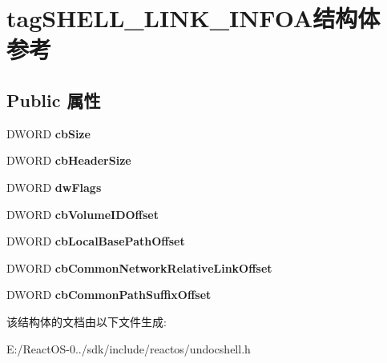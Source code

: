\hypertarget{structtag_s_h_e_l_l___l_i_n_k___i_n_f_o_a}{}\section{tag\+S\+H\+E\+L\+L\+\_\+\+L\+I\+N\+K\+\_\+\+I\+N\+F\+O\+A结构体 参考}
\label{structtag_s_h_e_l_l___l_i_n_k___i_n_f_o_a}
\subsection*{Public 属性}
\begin{DoxyCompactItemize}
\item 
\mbox{\label{structtag_s_h_e_l_l___l_i_n_k___i_n_f_o_a_a68884a5ecc94ac42af22512107b79ba3}} 
D\+W\+O\+RD {\bfseries cb\+Size}
\item 
\mbox{\label{structtag_s_h_e_l_l___l_i_n_k___i_n_f_o_a_a9873bd8a008321b14feece013510b743}} 
D\+W\+O\+RD {\bfseries cb\+Header\+Size}
\item 
\mbox{\label{structtag_s_h_e_l_l___l_i_n_k___i_n_f_o_a_a73e148d646ff89915029a9296969c7b9}} 
D\+W\+O\+RD {\bfseries dw\+Flags}
\item 
\mbox{\label{structtag_s_h_e_l_l___l_i_n_k___i_n_f_o_a_ada9e105a00b292b4d5c20ced4efc30b9}} 
D\+W\+O\+RD {\bfseries cb\+Volume\+I\+D\+Offset}
\item 
\mbox{\label{structtag_s_h_e_l_l___l_i_n_k___i_n_f_o_a_a04ea86a9f203ed1379077271a34fc43e}} 
D\+W\+O\+RD {\bfseries cb\+Local\+Base\+Path\+Offset}
\item 
\mbox{\label{structtag_s_h_e_l_l___l_i_n_k___i_n_f_o_a_ab031e1e491e244a20638183f90b73266}} 
D\+W\+O\+RD {\bfseries cb\+Common\+Network\+Relative\+Link\+Offset}
\item 
\mbox{\label{structtag_s_h_e_l_l___l_i_n_k___i_n_f_o_a_a287578934b3c17c82c0cc313199612cd}} 
D\+W\+O\+RD {\bfseries cb\+Common\+Path\+Suffix\+Offset}
\end{DoxyCompactItemize}


该结构体的文档由以下文件生成\+:\begin{DoxyCompactItemize}
\item 
E\+:/\+React\+O\+S-\/0../sdk/include/reactos/undocshell.\+h\end{DoxyCompactItemize}
